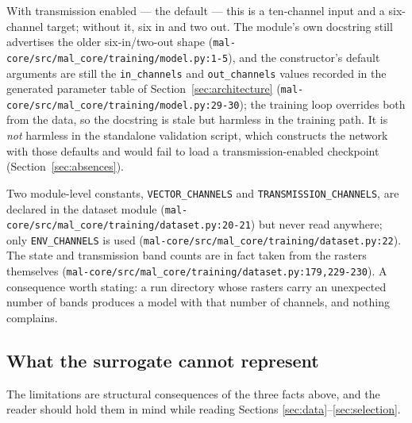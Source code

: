 \documentclass[11pt,a4paper]{article}
\newcommand{\codex}[1]{\texttt{#1}}
\begin{document}
With transmission enabled --- the default --- this is a ten-channel input and a
six-channel target; without it, six in and two out. The module's own
docstring still advertises the older six-in/two-out shape
(\codex{mal-core/\allowbreak{}src/\allowbreak{}mal\_\allowbreak{}core/\allowbreak{}training/\allowbreak{}model.py:1-5}), and the constructor's
default arguments are still the \codex{in\_\allowbreak{}channels} and
\codex{out\_\allowbreak{}channels} values recorded in the generated parameter
table of Section~\ref{sec:architecture}
(\codex{mal-core/\allowbreak{}src/\allowbreak{}mal\_\allowbreak{}core/\allowbreak{}training/\allowbreak{}model.py:29-30}); the training loop
overrides both from the data, so the docstring is stale but harmless in the
training path. It is \emph{not} harmless in the standalone validation script,
which constructs the network with those defaults and would fail to load a
transmission-enabled checkpoint (Section~\ref{sec:absences}).

Two module-level constants, \codex{VECTOR\_\allowbreak{}CHANNELS} and
\codex{TRANSMISSION\_\allowbreak{}CHANNELS}, are declared in the dataset module
(\codex{mal-core/\allowbreak{}src/\allowbreak{}mal\_\allowbreak{}core/\allowbreak{}training/\allowbreak{}dataset.py:20-21}) but never read
anywhere; only \codex{ENV\_\allowbreak{}CHANNELS} is used
(\codex{mal-core/\allowbreak{}src/\allowbreak{}mal\_\allowbreak{}core/\allowbreak{}training/\allowbreak{}dataset.py:22}). The state and
transmission band counts are in fact taken from the rasters themselves
(\codex{mal-core/\allowbreak{}src/\allowbreak{}mal\_\allowbreak{}core/\allowbreak{}training/\allowbreak{}dataset.py:179,229-230}). A consequence
worth stating: a run directory whose rasters carry an unexpected number of
bands produces a model with that number of channels, and nothing complains.

\subsection{What the surrogate cannot represent}

The limitations are structural consequences of the three facts above, and the
reader should hold them in mind while reading Sections
\ref{sec:data}--\ref{sec:selection}.
\end{document}
